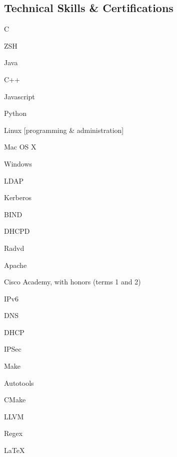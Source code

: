 \documentclass[a4paper,margin,line]{resume}
\begin{document}
\begin{resume}
\section{\mysidestyle Technical Skills \& Certifications}
	\begin{compactdesc}
		\item[Fluent Languages] \begin{inparaenum} { \small
			\item C
			\item ZSH
			\item Java
			\item C++
			\item Javascript
			\item Python
		} \end{inparaenum}
		\item[Operating Systems] \begin{inparaenum} { \small
			\item Linux [programming \& administration]
			\item Mac OS X
			\item Windows
		} \end{inparaenum}
		\item[Server Administration] \begin{inparaenum} { \small
			\item LDAP
			\item Kerberos
			\item BIND
			\item DHCPD
			\item Radvd
			\item Apache
		} \end{inparaenum}
		\item[Networking] \begin{inparaenum} { \small
			\item Cisco Academy, with honors (terms 1 and 2)
			\item IPv6
			\item DNS
			\item DHCP
			\item IPSec
		} \end{inparaenum}
		\item[Tools] \begin{inparaenum} { \small
			\item Make
			\item Autotools
			\item CMake
			\item LLVM
			\item Regex
			\item \LaTeX
		} \end{inparaenum}

\end{compactdesc}
\end{resume}
\end{document}
